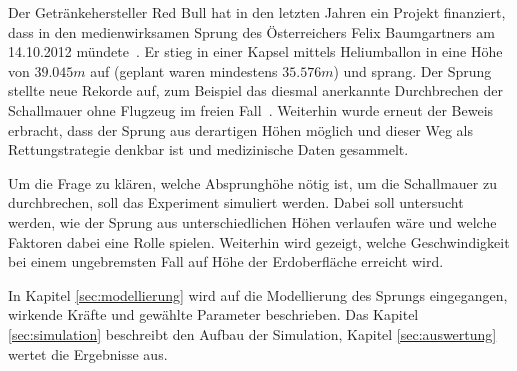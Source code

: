 Der Getränkehersteller Red Bull hat in den letzten Jahren ein Projekt finanziert, dass in den medienwirksamen Sprung des Österreichers Felix Baumgartners am 14.10.2012 mündete~\cite{rbstratos}.
Er stieg in einer Kapsel mittels Heliumballon in eine Höhe von $39.045m$ auf (geplant waren mindestens $35.576m$) und sprang.
Der Sprung stellte neue Rekorde auf, zum Beispiel das diesmal anerkannte Durchbrechen der Schallmauer ohne Flugzeug im freien Fall~\cite{fai:record}.
Weiterhin wurde erneut der Beweis erbracht, dass der Sprung aus derartigen Höhen möglich und dieser Weg als Rettungstrategie denkbar ist und medizinische Daten gesammelt.

Um die Frage zu klären, welche Absprunghöhe nötig ist, um die Schallmauer zu durchbrechen, soll das Experiment simuliert werden.
Dabei soll untersucht werden, wie der Sprung aus unterschiedlichen Höhen verlaufen wäre und welche Faktoren dabei eine Rolle spielen.
Weiterhin wird gezeigt, welche Geschwindigkeit bei einem ungebremsten Fall auf Höhe der Erdoberfläche erreicht wird.

In Kapitel \ref{sec:modellierung} wird auf die Modellierung des Sprungs eingegangen, wirkende Kräfte und gewählte Parameter beschrieben. Das Kapitel \ref{sec:simulation} beschreibt den Aufbau der Simulation, Kapitel \ref{sec:auswertung} wertet die Ergebnisse aus.
